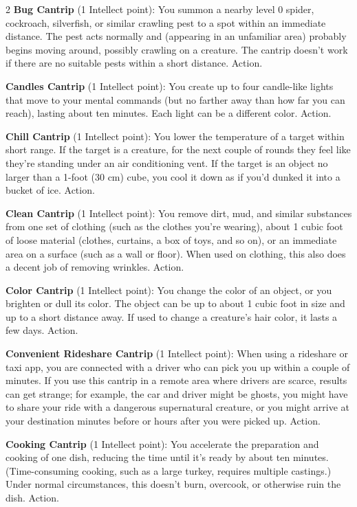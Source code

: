 \begin{multicols}{2}
\textbf{Bug Cantrip} (1 Intellect point): You summon a nearby level 0 spider, cockroach, silverfish, or similar crawling pest to a spot within an immediate distance. The pest acts normally and (appearing in an unfamiliar area) probably begins moving around, possibly crawling on a creature. The cantrip doesn’t work if there are no suitable pests within a short distance. Action. 

\textbf{Candles Cantrip} (1 Intellect point): You create up to four candle-like lights that move to your mental commands (but no farther away than how far you can reach), lasting about ten minutes. Each light can be a different color. Action. 

\textbf{Chill Cantrip} (1 Intellect point): You lower the temperature of a target within short range. If the target is a creature, for the next couple of rounds they feel like they’re standing under an air conditioning vent. If the target is an object no larger than a 1-foot (30 cm) cube, you cool it down as if you’d dunked it into a bucket of ice. Action. 

\textbf{Clean Cantrip} (1 Intellect point): You remove dirt, mud, and similar substances from one set of clothing (such as the clothes you’re wearing), about 1 cubic foot of loose material (clothes, curtains, a box of toys, and so on), or an immediate area on a surface (such as a wall or floor). When used on clothing, this also does a decent job of removing wrinkles. Action. 

\textbf{Color Cantrip} (1 Intellect point): You change the color of an object, or you brighten or dull its color. The object can be up to about 1 cubic foot in size and up to a short distance away. If used to change a creature’s hair color, it lasts a few days. Action. 

\textbf{Convenient Rideshare Cantrip} (1 Intellect point): When using a rideshare or taxi app, you are connected with a driver who can pick you up within a couple of minutes. If you use this cantrip in a remote area where drivers are scarce, results can get strange; for example, the car and driver might be ghosts, you might have to share your ride with a dangerous supernatural creature, or you might arrive at your destination minutes before or hours after you were picked up. Action. 

\textbf{Cooking Cantrip} (1 Intellect point): You accelerate the preparation and cooking of one dish, reducing the time until it’s ready by about ten minutes. (Time-consuming cooking, such as a large turkey, requires multiple castings.) Under normal circumstances, this doesn’t burn, overcook, or otherwise ruin the dish. Action. 


\end{multicols}
